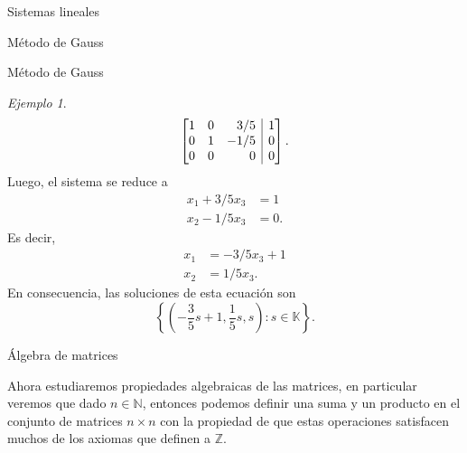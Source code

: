 \documentclass[a4paper,12pt,twoside,spanish,reqno]{amsbook}
\numberwithin{equation}{section}
\theoremstyle{definition}
\theoremstyle{remark}
\newtheorem*{ejemplo*}{Ejemplo}
\newcommand{\K}{\mathbb K}
\begin{document}
\begin{chapter}{Sistemas lineales}
\begin{section}{Método de Gauss }
\begin{subsection}{Método de Gauss}
\begin{ejemplo*}
\begin{multline*}
                    \left[\begin{array}{@{}*{3}{r}|r@{}}1 & 0 & 3/5 & 1 \\ 0 & 1 & -1/5 &  0 \\	0 & 0 & 0 &  0  \end{array}\right].
                    \end{multline*}	
                    Luego,  el sistema se reduce  a
                    \begin{align*}
                    x_1  + 3/5x_3  &= 1\\
                    x_2 -1/5 x_3  &= 0.
                    \end{align*}
                    Es decir, 
                    \begin{align*}
                    x_1    &= - 3/5x_3 + 1\\
                    x_2   &= 1/5 x_3.
                    \end{align*}
                    En consecuencia,  las soluciones de esta ecuación son
                    \begin{equation*}
                    \left\{(-\frac{3}5s + 1, \frac15 s, s ): s \in \K \right\}.
                    \end{equation*}
                \end{ejemplo*} 
                
                \end{subsection}
            
            
        \end{section}
        
        
        
        
        
        
        
        
        \begin{section}{Álgebra de matrices}\label{seccion-algebra-de-matrices}
            
            Ahora estudiaremos propiedades algebraicas de las matrices,  en particular veremos que dado $n\in \mathbb N$, entonces podemos definir una suma y un producto en el conjunto de matrices $n \times n$ con la propiedad de que estas operaciones satisfacen muchos de los axiomas que definen a  $\mathbb Z$.  
            
            
\end{section}
\end{chapter}
\end{document}
